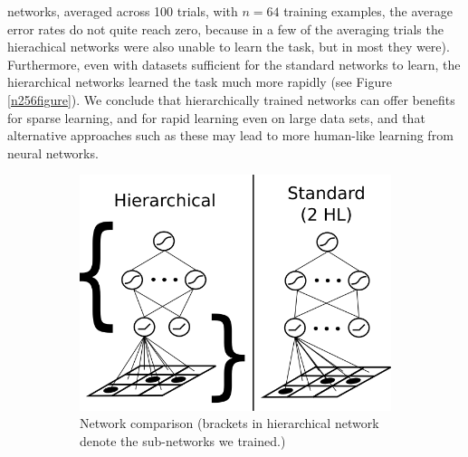 \documentclass[10pt]{article}
\begin{document}
networks, averaged across 100 trials, with $n = 64$ training examples, the average error rates do not quite reach zero, because in a few of the averaging trials the hierachical networks were also unable to learn the task, but in most they were). Furthermore, even with datasets sufficient for the standard networks to learn, the hierarchical networks learned the task much more rapidly (see Figure \ref{n256figure}). We conclude that hierarchically trained networks can offer benefits for sparse learning, and for rapid learning even on large data sets, and that alternative approaches such as these may lead to more human-like learning from neural networks. 

\begin{figure}[H]
    \centering
    \begin{subfigure}[c]{0.35\textwidth}
	\centering
	\includegraphics[width=\textwidth]{figures/hierarchical_NN_abstract_figure.png}
	\caption{Network comparison (brackets in hierarchical network denote the sub-networks we trained.)}
	\label{networkdiagram}
    \end{subfigure}
    \begin{subfigure}[c]{0.3\textwidth}
	\centering

\end{subfigure}
\end{figure}
\end{document}
